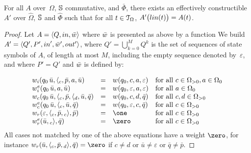 \begin{proposition}\label{lem:SWTA}
For all \SWTA $A$ over~$\Omega$, $\mathbb{S}$ commutative, and $\bar\Phi$,
there exists an effectively constructible \SWVPA $A'$ over
$\hat\Omega$, $\mathbb{S}$ and $\hat\Phi$
such that for all $t \in \mathcal{T}_\Omega$, $A'\bigl(\lin(t)\bigr) = A(t)$.
\end{proposition}
%
\begin{proof}
Let $A = \< Q, \init, \bar{\wei} >$ where $\bar{\wei}$ is presented as above by a function
We build
$A' = \< Q', P', \init', \bar{\wei}', \final' >$,
where $Q' = \bigcup_{k=0}^{M} Q^k$ is the set of sequences of state symbols of $A$,
of length at most $M$, including the empty sequence denoted by~$\varepsilon$,
and where $P' = Q'$ and $\bar\wei$ is defined by:

\[
\begin{array}{lcll}
\weii(q_0\, \bar{u}, {\call{c}}, \bar{p}, a, \bar{u}) & = & \wei(q_0, c, a, \varepsilon) &
\mathrm{for~all~} c \in \Omega_{>0}, a \in \Omega_0\\ %
%
\weiei(q_0\,\bar{u}, a, \bar{u}) & = & \wei(q_0, \varepsilon, a, \varepsilon) &
\mathrm{for~all~} a \in \Omega_0\\
%
\weic(q_0\,\bar{u}, {\call{c}}, \bar{p}, \call{d}, \bar{u}, \bar{q}) & = & \wei(q_0, c, d, \bar{q}) &
\mathrm{for~all~} c, d \in \Omega_{>0}\\ %
%
\weiec(q_0\,\bar{u}, \call{c}, \bar{u}, \bar{q}) & = & \wei(q_0, \varepsilon, c, \bar{q}) &
\mathrm{for~all~} c \in \Omega_{>0}\\
%
\weir(\varepsilon, {\call{c}}, \bar{p}, {\return{c}}, \bar{p}) & = & \one &
\mathrm{for~all~}  c \in \Omega_{>0}\\ %
%
\weier(\bar{u}, {\return{c}}, \bar{q}) & = & \zero &
\mathrm{for~all~}  c \in \Omega_{>0}
\end{array}
\]
\noindent
All cases not matched by one of the above equations have a weight $\zero$,
for instance  %
$\weir(\bar{u}, {\call{c}}, \bar{p}, {\return{d}}, \bar{q}) = \zero$
if $c \neq d$
or $\bar{u} \neq \varepsilon$
or $\bar{q} \neq \bar{p}$.
%
\end{proof}




\newpage
\listoftodos



